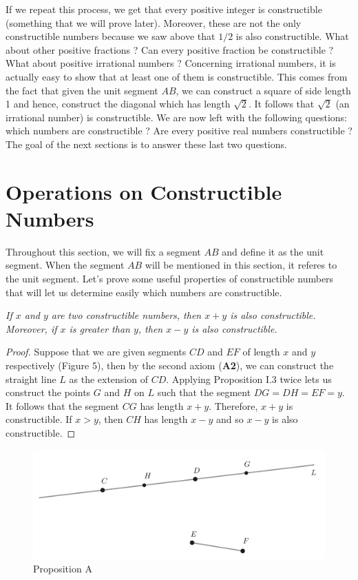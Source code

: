 \documentclass{article}
\theoremstyle{plain}
\theoremstyle{definition}
\newenvironment{customthm}[1]
  {\renewcommand\theinnercustomthm{#1}\innercustomthm}
  {\endinnercustomthm}
\begin{document}
If we repeat this process, we get that every positive integer is constructible (something that we will prove later). Moreover, these are not the only constructible numbers because we saw above that $1/2$ is also constructible. What about other positive fractions ? Can every positive fraction be constructible ? What about positive irrational numbers ? Concerning irrational numbers, it is actually easy to show that at least one of them is constructible. This comes from the fact that given the unit segment $AB$, we can construct a square of side length 1 and hence, construct the diagonal which has length $\sqrt{2}$. It follows that $\sqrt{2}$ (an irrational number) is constructible. We are now left with the following questions: which numbers are constructible ? Are every positive real numbers constructible ? The goal of the next sections is to answer these last two questions.

\section*{Operations on Constructible Numbers}

Throughout this section, we will fix a segment $AB$ and define it as the unit segment. When the segment $AB$ will be mentioned in this section, it referes to the unit segment. Let's prove some useful properties of constructible numbers that will let us determine easily which numbers are constructible.

\begin{customthm}{A}\label{A}
    \textit{If $x$ and $y$ are two constructible numbers, then $x + y$ is also constructible. Moreover, if $x$ is greater than $y$, then $x - y$ is also constructible.}
\end{customthm}

\begin{proof}
    Suppose that we are given segments $CD$ and $EF$ of length $x$ and $y$ respectively (Figure 5), then by the second axiom (\textbf{A2}), we can construct the straight line $L$ as the extension of $CD$. Applying Proposition I.3 twice lets us construct the points $G$ and $H$ on $L$ such that the segment $DG = DH = EF = y$. It follows that the segment $CG$ has length $x + y$. Therefore, $x + y$ is constructible. If $x > y$, then $CH$ has length $x - y$ and so $x - y$ is also constructible.
\end{proof}

\begin{figure}[h!]
    \centering
    \includegraphics[scale=0.3]{pics/PropositionA.png}
    \caption{Proposition A}
\end{figure}
\end{document}
